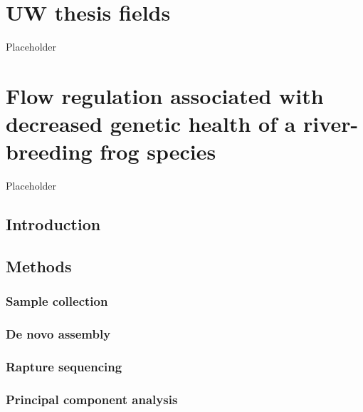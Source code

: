 \documentclass[twoside,12pt,final]{ucthesis-CA2012} %
\begin{document}
\begin{ucmainmatter}

\hypertarget{uw-thesis-fields}{%
\chapter{UW thesis fields}\label{uw-thesis-fields}}

Placeholder

\hypertarget{reg-health}{%
\chapter{Flow regulation associated with decreased genetic health of a
river-breeding frog species}\label{reg-health}}

Placeholder

\hypertarget{introduction}{%
\section{Introduction}\label{introduction}}

\hypertarget{methods}{%
\section{Methods}\label{methods}}

\hypertarget{sample-collection}{%
\subsection{Sample collection}\label{sample-collection}}

\hypertarget{de-novo-assembly}{%
\subsection{De novo assembly}\label{de-novo-assembly}}

\hypertarget{rapture-sequencing}{%
\subsection{Rapture sequencing}\label{rapture-sequencing}}

\hypertarget{principal-component-analysis}{%
\subsection{Principal component
analysis}\label{principal-component-analysis}}

\hypertarget{genetic-differentiation-and-diversity-estimates}{%
}
\end{ucmainmatter}
\end{document}
